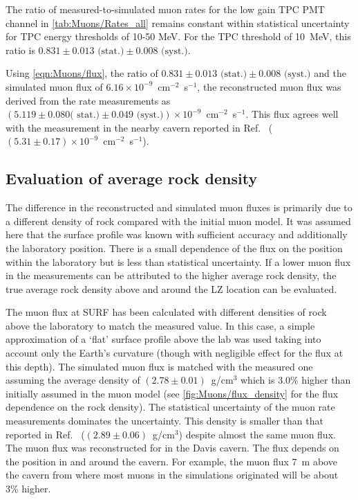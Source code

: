 The ratio of measured-to-simulated muon rates for the low gain TPC PMT channel in \autoref{tab:Muons/Rates_all} remains constant within statistical uncertainty for TPC energy thresholds of 10-50 MeV. For the TPC threshold of 10~MeV, this ratio is $0.831 \pm 0.013 \textrm{ (stat.)} \pm 0.008 \textrm{ (syst.)}$. 

Using \autoref{eqn:Muons/flux}, the ratio of $0.831 \pm 0.013 \text{ (stat.)} \pm 0.008 \text{ (syst.)}$ and the simulated muon flux of $6.16 \times10^{-9}$~cm$^{-2}$~s$^{-1}$, the reconstructed muon flux was derived from the rate measurements as $(5.119 \pm 0.080 \textrm{( stat.)} \pm 0.049 \textrm{ (syst.)})\times10^{-9}$~cm$^{-2}$~s$^{-1}$. This flux agrees well with the measurement in the nearby cavern reported in Ref.~\cite{majorana} ($(5.31 \pm 0.17)\times10^{-9}$~cm$^{-2}$~s$^{-1}$).

\subsection{Evaluation of average rock density}\label{sec:Muons/RockDensity}
The difference in the reconstructed and simulated muon fluxes is primarily due to a different density of rock compared with the initial muon model. It was assumed here that the surface profile was known with sufficient accuracy and additionally the laboratory position. There is a small dependence of the flux on the position within the laboratory but is less than statistical uncertainty. 
If a lower muon flux in the measurements can be attributed to the higher average rock density, the true average rock density above and around the LZ location can be evaluated. 

The muon flux at SURF has been calculated with different densities of rock above the laboratory to match the measured value. In this case, a simple approximation of a `flat' surface profile above the lab was used taking into account only the Earth's curvature (though with negligible effect for the flux at this depth). The simulated muon flux is matched with the measured one assuming the average density of $(2.78 \pm 0.01)$~g/cm$^3$ which is 3.0\% higher than initially assumed in the muon model (see \autoref{fig:Muons/flux_density} for the flux dependence on the rock density). The statistical uncertainty of the muon rate measurements dominates the uncertainty. This density is smaller than that reported in Ref.~\cite{majorana} ($(2.89 \pm 0.06)$~g/cm$^3$) despite almost the same muon flux. 
The muon flux was reconstructed for in the Davis cavern. The flux depends on the position in and around the cavern. For example, the muon flux 7~m above the cavern from where most muons in the simulations originated will be about 3\% higher. 


